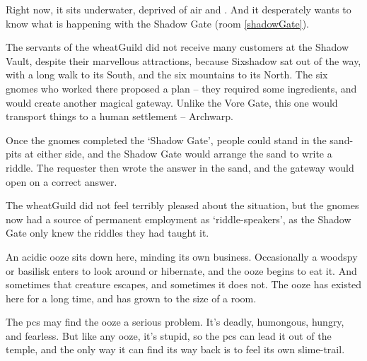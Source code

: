 \begin{multicols}{2}
Right now, it sits underwater, deprived of air and .
And it desperately wants to know what is happening with the Shadow Gate (room \vref{shadowGate}).



\begin{exampletext}
  The servants of the \gls{wheatGuild} did not receive many customers at the Shadow Vault, despite their marvellous attractions, because Sixshadow sat out of the way, with a long walk to its South, and the six mountains to its North.
  The six gnomes who worked there proposed a plan -- they required some \glspl{ingredient}, and would create another magical gateway.
  Unlike the Vore Gate, this one would transport things to a human settlement -- Archwarp.

  Once the gnomes completed the `Shadow Gate', people could stand in the sand-pits at either side, and the Shadow Gate would arrange the sand to write a riddle.
  The requester then wrote the answer in the sand, and the gateway would open on a correct answer.

  The \gls{wheatGuild} did not feel terribly pleased about the situation, but the gnomes now had a source of permanent employment as `riddle-speakers', as the Shadow Gate only knew the riddles they had taught it.
\end{exampletext}

An acidic ooze sits down here, minding its own business.
Occasionally a woodspy or basilisk enters to look around or hibernate, and the ooze begins to eat it.
And sometimes that creature escapes, and sometimes it does not.
The ooze has existed here for a long time, and has grown to the size of a room.

\uncommonlyLargeJelly

The \glspl{pc} may find the ooze a serious problem.
It's deadly, humongous, hungry, and fearless.
But like any ooze, it's stupid, so the \glspl{pc} can lead it out of the temple, and the only way it can find its way back is to feel its own slime-trail.



\end{multicols}
